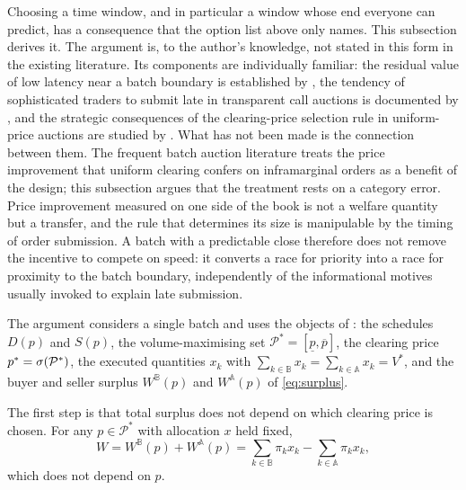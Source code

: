 Choosing a time window, and in particular a window whose end everyone can
predict, has a consequence that the option list above only names. This
subsection derives it. The argument is, to the author's knowledge, not
stated in this form in the existing literature. Its components are
individually familiar: the residual value of low latency near a batch
boundary is established by \citet{schlegel2023transaction}, the tendency of
sophisticated traders to submit late in transparent call auctions is
documented by \citet{daures2026click}, and the strategic consequences of
the clearing-price selection rule in uniform-price auctions are studied by
\citet{burkett2020uniform}. What has not been made is the connection
between them. The frequent batch auction literature treats the price
improvement that uniform clearing confers on inframarginal orders as a
benefit of the design; this subsection argues that the treatment rests on a
category error. Price improvement measured on one side of the book is not
a welfare quantity but a transfer, and the rule that determines its size
is manipulable by the timing of order submission. A batch with a
predictable close therefore does not remove the incentive to compete on
speed: it converts a race for priority into a race for proximity to the
batch boundary, independently of the informational motives usually
invoked to explain late submission.

The argument considers a single batch and uses the objects of
: the schedules $D(p)$ and $S(p)$, the
volume-maximising set $\mathcal{P}^{*} = [\underline{p}, \overline{p}]$,
the clearing price $p^{\ast} = \sigma(\mathcal{P}^{*})$, the executed
quantities $x_k$ with $\sum_{k \in \mathbb{B}} x_k = \sum_{k \in \mathbb{A}}
x_k = V^{*}$, and the buyer and seller surplus $W^{\mathbb{B}}(p)$ and
$W^{\mathbb{A}}(p)$ of \eqref{eq:surplus}.

The first step is that total surplus does not depend on which clearing
price is chosen. For any $p \in \mathcal{P}^{*}$ with allocation $x$ held fixed,
\begin{equation}
\label{lem:invariance}
  W = W^{\mathbb{B}}(p) + W^{\mathbb{A}}(p)
    = \sum_{k \in \mathbb{B}} \pi_k x_k
      - \sum_{k \in \mathbb{A}} \pi_k x_k ,
\end{equation}
which does not depend on $p$.

